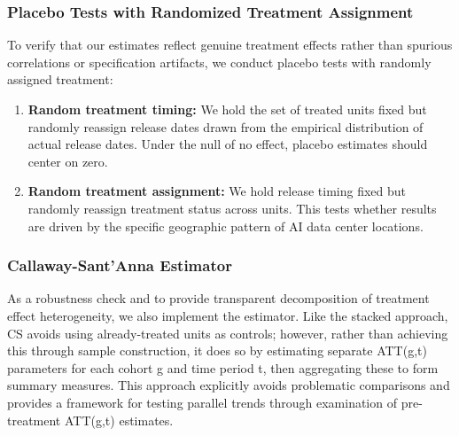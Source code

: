 \documentclass[sigconf]{acmart}
\newcommand{\nb}[1]{\textcolor{blue}{NB[#1]}}
\begin{document}
\subsubsection{Placebo Tests with Randomized Treatment Assignment}

To verify that our estimates reflect genuine treatment effects rather than spurious correlations or specification artifacts, we conduct placebo tests with randomly assigned treatment:
\begin{enumerate}
    \item \textbf{Random treatment timing:} We hold the set of treated units fixed but randomly reassign release dates drawn from the empirical distribution of actual release dates. Under the null of no effect, placebo estimates should center on zero.
    \item \textbf{Random treatment assignment:} We hold release timing fixed but randomly reassign treatment status across units. This tests whether results are driven by the specific geographic pattern of AI data center locations.
\end{enumerate}

\subsubsection{Callaway-Sant'Anna Estimator}

As a robustness check and to provide transparent decomposition of treatment effect heterogeneity, we also implement the \citet{callaway2021difference} estimator. Like the stacked approach, CS avoids using already-treated units as controls; however, rather than achieving this through sample construction, it does so by estimating separate ATT(g,t) parameters for each cohort g and time period t, then aggregating these to form summary measures. This approach explicitly avoids problematic comparisons and provides a framework for testing parallel trends through examination of pre-treatment ATT(g,t) estimates. 
\end{document}
